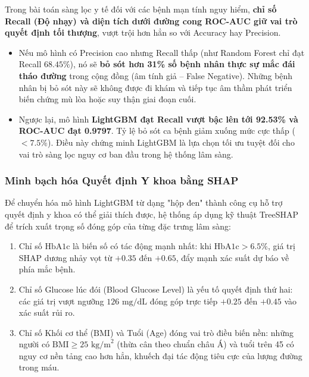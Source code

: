 \documentclass[12pt,a4paper]{article}
\begin{document}
\begin{tcolorbox}[colback=blue!5!white,colframe=ptitblue,title=Phân Tích Chuyên Sâu Về Ý Nghĩa Lâm Sàng Của Recall]
Trong bài toán sàng lọc y tế đối với các bệnh mạn tính nguy hiểm, \textbf{chỉ số Recall (Độ nhạy) và diện tích dưới đường cong ROC-AUC giữ vai trò quyết định tối thượng}, vượt trội hơn hẳn so với Accuracy hay Precision. 
\begin{itemize}[leftmargin=0.8cm]
    \item Nếu mô hình có Precision cao nhưng Recall thấp (như Random Forest chỉ đạt Recall $68.45\%$), nó sẽ \textbf{bỏ sót hơn 31\% số bệnh nhân thực sự mắc đái tháo đường} trong cộng đồng (âm tính giả -- False Negative). Những bệnh nhân bị bỏ sót này sẽ không được đi khám và tiếp tục âm thầm phát triển biến chứng mù lòa hoặc suy thận giai đoạn cuối.
    \item Ngược lại, mô hình \textbf{LightGBM đạt Recall vượt bậc lên tới 92.53\% và ROC-AUC đạt 0.9797}. Tỷ lệ bỏ sót ca bệnh giảm xuống mức cực thấp ($< 7.5\%$). Điều này chứng minh LightGBM là lựa chọn tối ưu tuyệt đối cho vai trò sàng lọc nguy cơ ban đầu trong hệ thống lâm sàng.
\end{itemize}
\end{tcolorbox}

\subsubsection{Minh bạch hóa Quyết định Y khoa bằng SHAP}
Để chuyển hóa mô hình LightGBM từ dạng "hộp đen" thành công cụ hỗ trợ quyết định y khoa có thể giải thích được, hệ thống áp dụng kỹ thuật TreeSHAP để trích xuất trọng số đóng góp của từng đặc trưng lâm sàng:
\begin{enumerate}[leftmargin=1.2cm]
    \item Chỉ số $\text{HbA1c}$ là biến số có tác động mạnh nhất: khi $\text{HbA1c} > 6.5\%$, giá trị SHAP dương nhảy vọt từ $+0.35$ đến $+0.65$, đẩy mạnh xác suất dự báo về phía mắc bệnh.
    \item Chỉ số Glucose lúc đói (Blood Glucose Level) là yếu tố quyết định thứ hai: các giá trị vượt ngưỡng $126\text{ mg/dL}$ đóng góp trực tiếp $+0.25$ đến $+0.45$ vào xác suất rủi ro.
    \item Chỉ số Khối cơ thể ($\text{BMI}$) và Tuổi (Age) đóng vai trò điều biến nền: những người có $\text{BMI} \ge 25\text{ kg/m}^2$ (thừa cân theo chuẩn châu Á) và tuổi trên 45 có nguy cơ nền tảng cao hơn hẳn, khuếch đại tác động tiêu cực của lượng đường trong máu.
\end{enumerate}
\end{document}
